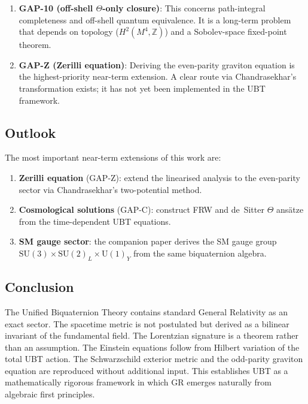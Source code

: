 \documentclass[12pt,a4paper]{article}
\theoremstyle{definition}
\theoremstyle{remark}
\begin{document}
\begin{enumerate}
\item \textbf{GAP-10 (off-shell $\Theta$-only closure)}: This concerns
  path-integral completeness and off-shell quantum equivalence.  It is
  a long-term problem that depends on topology ($H^2(M^4,\mathbb{Z})$)
  and a Sobolev-space fixed-point theorem.

\item \textbf{GAP-Z (Zerilli equation)}: Deriving the even-parity graviton
  equation is the highest-priority near-term extension.  A clear route via
  Chandrasekhar's transformation exists; it has not yet been implemented
  in the UBT framework.
\end{enumerate}

\subsection{Outlook}

The most important near-term extensions of this work are:
\begin{enumerate}
\item \textbf{Zerilli equation} (GAP-Z): extend the linearised analysis
  to the even-parity sector via Chandrasekhar's two-potential method.
\item \textbf{Cosmological solutions} (GAP-C): construct FRW and
  de~Sitter $\Theta$ ansätze from the time-dependent UBT equations.
\item \textbf{SM gauge sector}: the companion paper \cite{T2GAUGE2026}
  derives the SM gauge group $\mathrm{SU}(3)\times\mathrm{SU}(2)_L\times\mathrm{U}(1)_Y$
  from the same biquaternion algebra.
\end{enumerate}

\subsection{Conclusion}

The Unified Biquaternion Theory contains standard General Relativity as an exact
sector.  The spacetime metric is not postulated but derived as a bilinear invariant
of the fundamental field.  The Lorentzian signature is a theorem rather than an
assumption.  The Einstein equations follow from Hilbert variation of the total
UBT action.  The Schwarzschild exterior metric and the odd-parity graviton equation
are reproduced without additional input.  This establishes UBT as a mathematically
rigorous framework in which GR emerges naturally from algebraic first principles.
\end{document}
